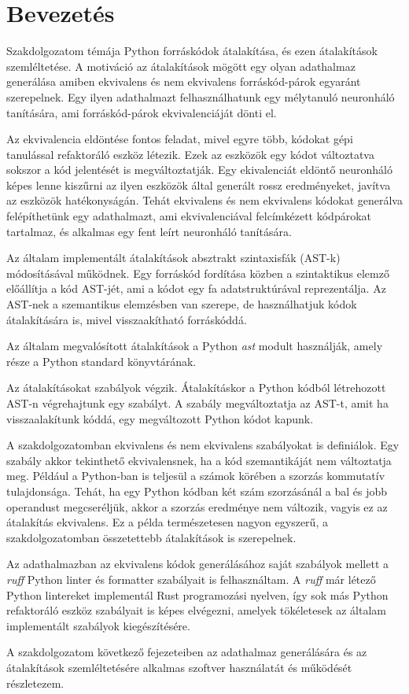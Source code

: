 \chapter{Bevezetés}
\label{ch:intro}

Szakdolgozatom témája Python forráskódok átalakítása, és ezen átalakítások szemléltetése.
A motiváció az átalakítások mögött egy olyan adathalmaz generálása amiben ekvivalens és nem
ekvivalens 
forráskód-párok egyaránt szerepelnek. Egy ilyen adathalmazt felhasználhatunk egy mélytanuló
neuronháló tanítására,
ami forráskód-párok ekvivalenciáját dönti el.

Az ekvivalencia eldöntése fontos feladat, mivel egyre több, kódokat gépi tanulással refaktoráló
eszköz létezik.
Ezek az eszközök egy kódot változtatva sokszor a kód jelentését is megváltoztatják.
Egy ekivalenciát eldöntő neuronháló képes lenne kiszűrni az ilyen eszközök által generált
rossz eredményeket, javítva az eszközök hatékonyságán.
Tehát ekvivalens és nem ekvivalens kódokat generálva felépíthetünk egy adathalmazt, ami
ekvivalenciával felcímkézett kódpárokat tartalmaz, és alkalmas egy fent leírt neuronháló
tanítására.

Az általam implementált átalakítások absztrakt szintaxisfák (AST-k) módosításával működnek.
Egy forráskód fordítása közben a szintaktikus elemző előállítja a kód AST-jét,
ami a kódot egy fa adatstruktúrával reprezentálja.
Az AST-nek a szemantikus elemzésben van szerepe,
de használhatjuk kódok átalakítására is, mivel visszaakítható forráskóddá.

Az általam megvalósított átalakítások a Python \emph{ast} modult \cite{pythonAST} használják,
amely része a Python standard könyvtárának.

\pagebreak

Az átalakításokat szabályok végzik. Átalakításkor a Python kódból létrehozott AST-n
végrehajtunk egy szabályt.
A szabály megváltoztatja az AST-t, amit ha visszaalakítunk kóddá,
egy megváltozott Python kódot kapunk.

A szakdolgozatomban ekvivalens és nem ekvivalens szabályokat is definiálok.
Egy szabály akkor tekinthető ekvivalensnek, ha a kód szemantikáját nem változtatja meg.
Például a Python-ban is teljesül a számok körében a szorzás kommutatív tulajdonsága.
Tehát, ha egy Python kódban két szám szorzásánál a bal és jobb operandust megcseréljük,
akkor a szorzás eredménye nem változik, vagyis ez az átalakítás ekvivalens.
Ez a példa természetesen nagyon egyszerű, a szakdolgozatomban összetettebb átalakítások
is szerepelnek.

Az adathalmazban az ekvivalens kódok generálásához saját szabályok mellett
a \emph{ruff} Python linter és formatter \cite{Ruff} szabályait is felhasználtam.
A \emph{ruff} már létező Python lintereket implementál Rust programozási nyelven,
így sok más Python refaktoráló eszköz szabályait is képes elvégezni,
amelyek tökéletesek az általam implementált szabályok kiegészítésére.

A szakdolgozatom következő fejezeteiben az adathalmaz generálására és az átalakítások
szemléltetésére alkalmas szoftver használatát és működését részletezem.
